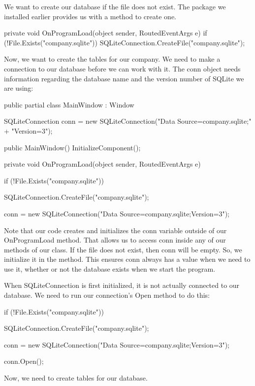 \documentclass[oneside, openany] {book}
\begin{document}
We want to create our database if the file does not exist. The package we installed earlier provides us with a method to create one.

\begin{CSharp}
private void OnProgramLoad(object sender, RoutedEventArgs e)
        {
            if (!File.Exists("company.sqlite"))
            {
                SQLiteConnection.CreateFile("company.sqlite");
            }
        }
\end{CSharp}
Now, we want to create the tables for our company. We need to make a connection to our database before we can work with it. The conn object needs information regarding the database name and the version number of SQLite we are using:

\begin{CSharp}
public partial class MainWindow : Window
    {
        SQLiteConnection conn = new SQLiteConnection("Data Source=company.sqlite;"
        + "Version=3");
        
        public MainWindow()
        {
            InitializeComponent();
        }

        private void OnProgramLoad(object sender, RoutedEventArgs e)
        {
            if (!File.Exists("company.sqlite"))
            {
                SQLiteConnection.CreateFile("company.sqlite");
               
                conn = new SQLiteConnection("Data Source=company.sqlite;Version=3");
            }
        }
    }
\end{CSharp}

Note that our code creates and initializes the conn variable outside of our OnProgramLoad method. That allows us to access conn inside any of our methods of our class. If the file does not exist, then conn will be empty. So, we initialize it in the method. This ensures conn always has a value when we need to use it, whether or not the database exists when we start the program.

When SQLiteConnection is first initialized, it is not actually connected to our database. We need to run our connection's Open method to do this:

\begin{CSharp}
if (!File.Exists("company.sqlite"))
            {
                SQLiteConnection.CreateFile("company.sqlite");
               
                conn = new SQLiteConnection("Data Source=company.sqlite;Version=3");

                conn.Open();
            }
\end{CSharp}
Now, we need to create tables for our database.
\end{document}

